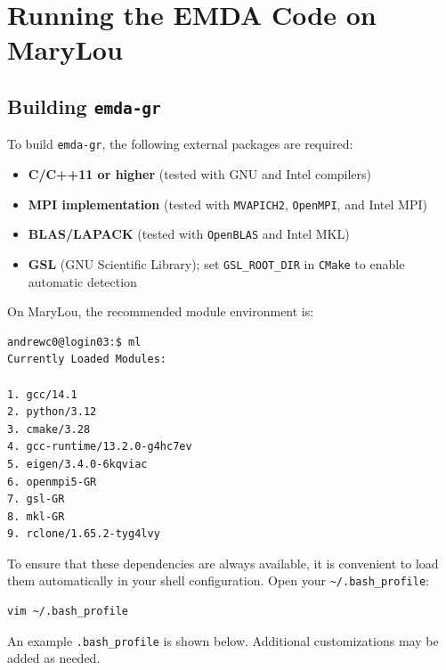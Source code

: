 \chapter{Running the EMDA Code on MaryLou}

\section{Building \texttt{emda-gr}}
To build \texttt{emda-gr}, the following external packages are required:
\begin{itemize}
\item \textbf{C/C++11 or higher} (tested with GNU and Intel compilers)
\item \textbf{MPI implementation} (tested with \texttt{MVAPICH2}, \texttt{OpenMPI}, and Intel MPI)
\item \textbf{BLAS/LAPACK} (tested with \texttt{OpenBLAS} and Intel MKL)
\item \textbf{GSL} (GNU Scientific Library); set \texttt{GSL\_ROOT\_DIR} in \texttt{CMake} to enable automatic detection
\end{itemize}

On MaryLou, the recommended module environment is:

\begin{verbatim}
andrewc0@login03:$ ml
Currently Loaded Modules:

1. gcc/14.1
2. python/3.12
3. cmake/3.28
4. gcc-runtime/13.2.0-g4hc7ev
5. eigen/3.4.0-6kqviac
6. openmpi5-GR
7. gsl-GR
8. mkl-GR
9. rclone/1.65.2-tyg4lvy
   \end{verbatim}

To ensure that these dependencies are always available, it is convenient to load
them automatically in your shell configuration. Open your
\texttt{\textasciitilde/.bash\_profile}:

\begin{verbatim}
vim ~/.bash_profile
\end{verbatim}

An example \texttt{.bash\_profile} is shown below. Additional customizations may
be added as needed.

